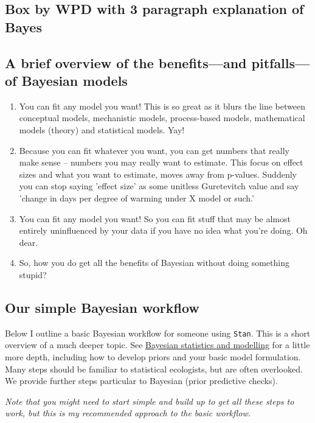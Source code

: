 \documentclass[11pt]{article}
\begin{document}
\subsection{Box by WPD with 3 paragraph explanation of Bayes}

\subsection{A brief overview of the benefits---and pitfalls---of Bayesian models} 
\begin{enumerate}
\item You can fit any model you want! This is so great as it blurs the line between conceptual models, mechanistic models, process-based models, mathematical models (theory) and statistical models. Yay!
\item Because you can fit whatever you want, you can get numbers that really make sense -- numbers you may really want to estimate. This focus on effect sizes and what you want to estimate, moves away from p-values. Suddenly you can stop saying 'effect size' as some unitless Guretevitch value and say 'change in days per degree of warming under X model or such.' 
\item You can fit any model you want! So you can fit stuff that may be almost entirely uninfluenced by your data if you have no idea what you're doing. Oh dear.
\item So, how you do get all the benefits of Bayesian without doing something stupid?  
\end{enumerate}

\subsection{Our simple Bayesian workflow}

Below I outline a basic Bayesian workflow for someone using \verb|Stan|. This is a short overview of a much deeper topic. See \href{https://www.nature.com/articles/s43586-020-00001-2}{Bayesian statistics and modelling} for a little more depth, including how to develop priors and your basic model formulation.\\

Many steps should be familiar to statistical ecologists, but are often overlooked. We provide further steps particular to Bayesian (prior predictive checks).

\emph{Note that you might need to start simple and build up to get all these steps to work, but this is my recommended approach to the basic workflow.}
\end{document}
